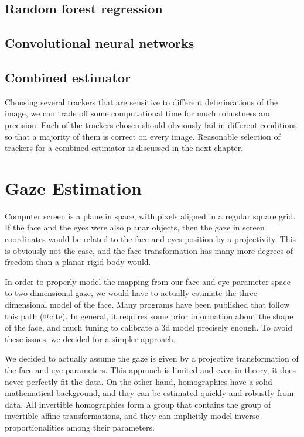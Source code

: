 \subsection{Random forest regression}

\subsection{Convolutional neural networks}

\subsection{Combined estimator}

Choosing several trackers that are sensitive to different deteriorations of the image, we can trade off some computational time for much robustness and precision.
Each of the trackers chosen should obviously fail in different conditions so that a majority of them is correct on every image.
Reasonable selection of trackers for a combined estimator is discussed in the next chapter.

\section{Gaze Estimation}

Computer screen is a plane in space, with pixels aligned in a regular square grid.
If the face and the eyes were also planar objects, then the gaze in screen coordinates would be related to the face and eyes position by a projectivity.
This is obviously not the case, and the face transformation has many more degrees of freedom than a planar rigid body would.
 
In order to properly model the mapping from our face and eye parameter space to two-dimensional gaze, we would have to actually estimate the three-dimensional model of the face.
Many programs have been published that follow this path (@cite).
In general, it requires some prior information about the shape of the face, and much tuning to calibrate a 3d model precisely enough.
To avoid these issues, we decided for a simpler approach.

We decided to actually assume the gaze is given by a projective transformation of the face and eye parameters.
This approach is limited and even in theory, it does never perfectly fit the data.
On the other hand, homographies have a solid mathematical background, and they can be estimated quickly and robustly from data.
All invertible homographies form a group that contains the group of invertible affine transformations, and they can implicitly model inverse proportionalities among their parameters.



